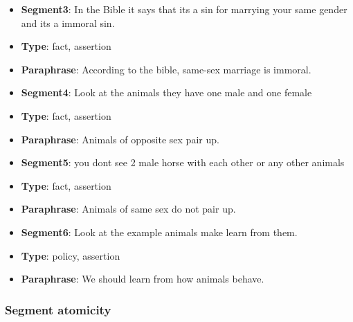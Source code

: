 \begin{itemize}[topsep=0.3cm]
\item[] \textbf{Segment3}: In the Bible it says that its a sin for marrying your same gender and its a immoral sin.
\item[] \textbf{Type}: fact, assertion
\item[] \textbf{Paraphrase}: According to the bible, same-sex marriage is immoral.
\end{itemize}

\begin{itemize}[topsep=0.3cm]
\item[] \textbf{Segment4}: Look at the animals they have one male and one female
\item[] \textbf{Type}: fact, assertion
\item[] \textbf{Paraphrase}: Animals of opposite sex pair up.
\end{itemize}

\begin{itemize}[topsep=0.3cm]
\item[] \textbf{Segment5}: you dont see 2 male horse with each other or any other animals
\item[] \textbf{Type}: fact, assertion
\item[] \textbf{Paraphrase}: Animals of same sex do not pair up.
\end{itemize}

\begin{itemize}[topsep=0.3cm]
\item[] \textbf{Segment6}: Look at the example animals make learn from them.
\item[] \textbf{Type}: policy, assertion
\item[] \textbf{Paraphrase}: We should learn from how animals behave.
\end{itemize}

\subsubsection*{Segment atomicity}


